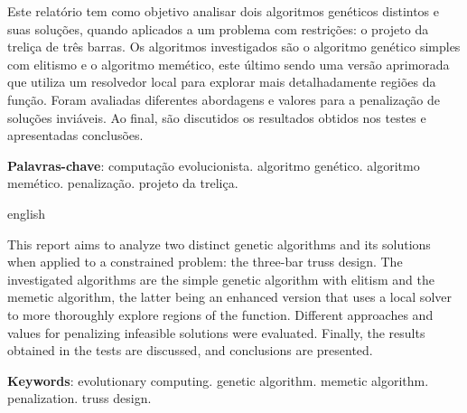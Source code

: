 \begin{resumoumacoluna}
    Este relatório tem como objetivo analisar dois algoritmos genéticos distintos e suas soluções, quando aplicados a um problema com restrições: o projeto da treliça de três barras. Os algoritmos investigados são o algoritmo genético simples com elitismo e o algoritmo memético, este último sendo uma versão aprimorada que utiliza um resolvedor local para explorar mais detalhadamente regiões da função.
    Foram avaliadas diferentes abordagens e valores para a penalização de soluções inviáveis. Ao final, são discutidos os resultados obtidos nos testes e apresentadas conclusões.

    \noindent
    \textbf{Palavras-chave}: computação evolucionista. algoritmo genético. algoritmo memético. penalização. projeto da treliça.
\end{resumoumacoluna}

\renewcommand{\resumoname}{Abstract}
\begin{resumoumacoluna}
    \begin{otherlanguage*}{english}

        This report aims to analyze two distinct genetic algorithms and its solutions when applied to a constrained problem: the three-bar truss design. The investigated algorithms are the simple genetic algorithm with elitism and the memetic algorithm, the latter being an enhanced version that uses a local solver to more thoroughly explore regions of the function.
        Different approaches and values for penalizing infeasible solutions were evaluated. Finally, the results obtained in the tests are discussed, and conclusions are presented.

        \vspace{\onelineskip}

        \noindent
        \textbf{Keywords}: evolutionary computing. genetic algorithm. memetic algorithm. penalization. truss design.
    \end{otherlanguage*}
\end{resumoumacoluna}
